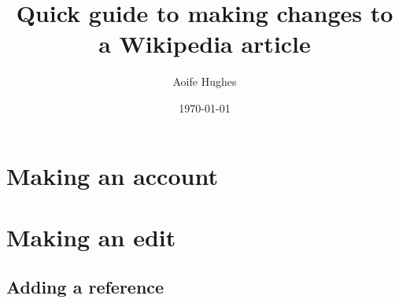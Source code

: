 \documentclass[11pt]{article}
\title{Quick guide to making changes to a Wikipedia article}
\author{ Aoife Hughes }
\date{\today}
\begin{document}
\maketitle	
\pagebreak



\section{Making an account}


\section{Making an edit}

\subsection{Adding a reference}
\end{document}
